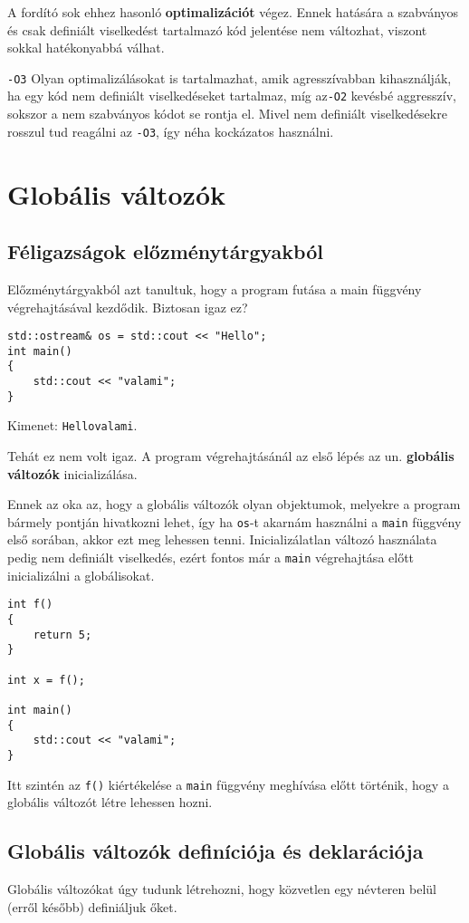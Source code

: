 \documentclass[a4paper,11.5pt,table]{article}
\begin{document}
	A fordító sok ehhez hasonló \textbf{optimalizációt} végez. Ennek hatására a szabványos és csak definiált viselkedést tartalmazó kód jelentése nem változhat, viszont sokkal hatékonyabbá válhat.
	\begin{note}
		\texttt{-O3} Olyan optimalizálásokat is tartalmazhat, amik agresszívabban kihasználják, ha egy kód nem definiált viselkedéseket tartalmaz, míg az\texttt{-O2} kevésbé aggresszív, sokszor a nem szabványos kódot se rontja el. Mivel nem definiált viselkedésekre rosszul tud reagálni az \texttt{-O3}, így néha kockázatos használni.
	\end{note}
	\section{Globális változók}
	\subsection{Féligazságok előzménytárgyakból}
	Előzménytárgyakból azt tanultuk, hogy a program futása a main függvény végrehajtásával kezdődik. Biztosan igaz ez?
	\begin{lstlisting}
std::ostream& os = std::cout << "Hello";
int main()
{
	std::cout << "valami";
}
	\end{lstlisting}
	Kimenet: \texttt{Hellovalami}.
	\medskip
	
	Tehát ez nem volt igaz. A program végrehajtásánál az első lépés az un. \textbf{globális változók} inicializálása. 
	
	Ennek az oka az, hogy a globális változók olyan objektumok, melyekre a program bármely pontján hivatkozni lehet, így ha \texttt{os}-t akarnám használni a \texttt{main} függvény első sorában, akkor ezt meg lehessen tenni. Inicializálatlan változó használata pedig nem definiált viselkedés, ezért fontos már a \texttt{main} végrehajtása előtt inicializálni a globálisokat.
	\begin{lstlisting}
int f()
{
	return 5;
}

int x = f();

int main()
{
	std::cout << "valami";
}
	\end{lstlisting}
	Itt szintén az \texttt{f()} kiértékelése a \texttt{main} függvény meghívása előtt történik, hogy a globális változót létre lehessen hozni.
	\subsection{Globális változók definíciója és deklarációja}
	Globális változókat úgy tudunk létrehozni, hogy közvetlen egy névteren belül (erről később) definiáljuk őket.
	\medskip
	
\end{document}
